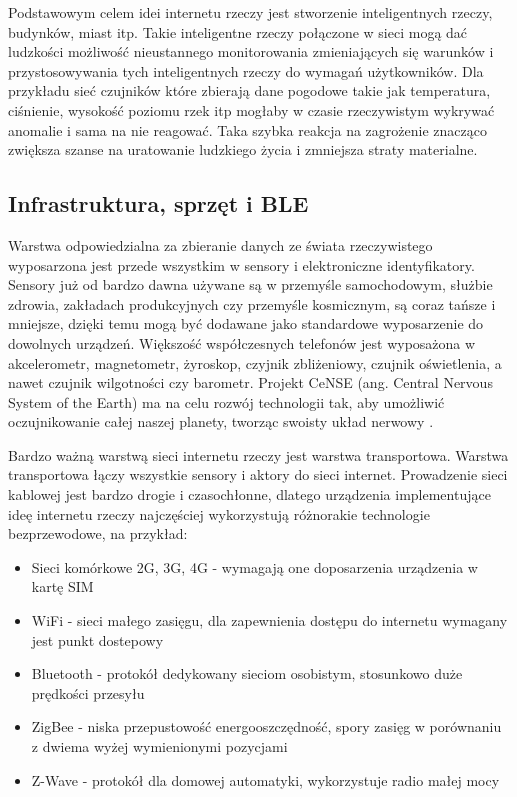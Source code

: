 Podstawowym celem idei internetu rzeczy jest stworzenie inteligentnych rzeczy, budynków, miast itp. Takie inteligentne rzeczy połączone w sieci mogą dać ludzkości możliwość nieustannego monitorowania zmieniających się warunków i przystosowywania tych inteligentnych rzeczy do wymagań użytkowników. Dla przykładu sieć czujników które zbierają dane pogodowe takie jak temperatura, ciśnienie, wysokość poziomu rzek itp mogłaby w czasie rzeczywistym wykrywać anomalie i sama na nie reagować. Taka szybka reakcja na zagrożenie znacząco zwiększa szanse na uratowanie ludzkiego życia i zmniejsza straty materialne.

\subsection{Infrastruktura, sprzęt i BLE \cite{infrastrukturaiot}}

Warstwa odpowiedzialna za zbieranie danych ze świata rzeczywistego wyposarzona jest przede wszystkim w sensory i elektroniczne identyfikatory. Sensory już od bardzo dawna używane są w przemyśle samochodowym, służbie zdrowia, zakładach produkcyjnych czy przemyśle kosmicznym, są coraz tańsze i mniejsze, dzięki temu mogą być dodawane jako standardowe wyposarzenie do dowolnych urządzeń. Większość współczesnych telefonów jest wyposażona w akcelerometr, magnetometr, żyroskop, czyjnik zbliżeniowy, czujnik oświetlenia, a nawet czujnik wilgotności czy barometr. Projekt CeNSE (ang. Central Nervous System of the Earth) ma na celu rozwój technologii tak, aby umożliwić oczujnikowanie całej naszej planety, tworząc swoisty układ nerwowy \cite{cense}.

Bardzo ważną warstwą sieci internetu rzeczy jest warstwa transportowa. Warstwa transportowa łączy wszystkie sensory i aktory do sieci internet. Prowadzenie sieci kablowej jest bardzo drogie i czasochłonne, dlatego urządzenia implementujące ideę internetu rzeczy najczęściej wykorzystują różnorakie technologie bezprzewodowe, na przykład:

\begin{itemize}
	\item{Sieci komórkowe 2G, 3G, 4G - wymagają one doposarzenia urządzenia w kartę SIM}
	\item{WiFi - sieci małego zasięgu, dla zapewnienia dostępu do internetu wymagany jest punkt dostepowy}
	\item{Bluetooth - protokół dedykowany sieciom osobistym, stosunkowo duże prędkości przesyłu}
	\item{ZigBee - niska przepustowość energooszczędność, spory zasięg w porównaniu z dwiema wyżej wymienionymi pozycjami}
	\item{Z-Wave - protokół dla domowej automatyki, wykorzystuje radio małej mocy}
\end{itemize}

